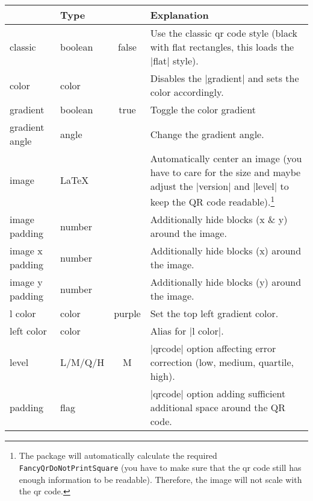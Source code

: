 \documentclass[parskip=half,english,numbers=noenddot,footnotes=nomultiple,oneside]{scrartcl}
\def\ltx#1{\lstinline/#1/}
\begin{document}
\begin{savenotes}
\begin{table}
	\centering\begin{tabular}{>{\ttfamily}ll>{\ttfamily}cp{.5\linewidth}}
		\toprule
		\multicolumn{1}{l}{Option} & Type & \multicolumn{1}{c}{Default} & Explanation \\
		\midrule
		classic         & boolean &   false  & Use the classic qr code style (black with flat rectangles, this loads the |flat| style).                                \\
		color           & color   &          & Disables the |gradient| and sets the color accordingly.      \\
		gradient        & boolean &   true   & Toggle the color gradient                                    \\
		gradient angle  & angle   &  135     & Change the gradient angle.                                   \\
		image           & \LaTeX   &          & Automatically center an image (you have to care for the size and maybe adjust the |version| and |level| to keep the QR code readable).\footnote{The package will automatically calculate the required \ltx{\\FancyQrDoNotPrintSquare} (you have to make sure that the qr code still has enough information to be readable). Therefore, the image will not scale with the qr code.} \\
		image padding   & number  &          & Additionally hide blocks (x \& y) around the image.          \\
		image x padding & number  &   0      & Additionally hide blocks (x) around the image.               \\
		image y padding & number  &   0      & Additionally hide blocks (y) around the image.               \\
		l color         & color   & purple   & Set the top left gradient color.                             \\
		left color      & color   &          & Alias for |l color|.                                         \\
		level 			 & L/M/Q/H &   M      & |qrcode| option affecting error correction (low, medium, quartile, high).                                     \\
		padding         & flag    &          & |qrcode| option adding sufficient additional space around the QR code.                                            \\

\end{tabular}
\end{table}
\end{savenotes}
\end{document}
